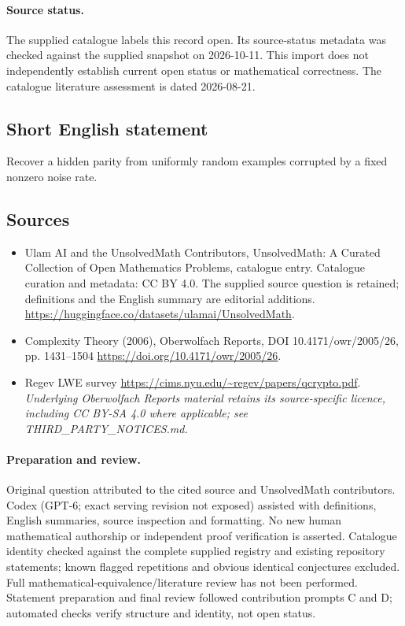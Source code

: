 \documentclass[11pt]{article}
\begin{document}
\paragraph{Source status.}
The supplied catalogue labels this record open. Its source-status metadata was checked against the supplied snapshot on 2026-10-11. This import does not independently establish current open status or mathematical correctness. The catalogue literature assessment is dated 2026-08-21.
\subsection{Short English statement}
Recover a hidden parity from uniformly random examples corrupted by a fixed nonzero noise rate.
\subsection{Sources}
\begin{itemize}
\item[\hypertarget{source:statement:1}{S1}] Ulam AI and the UnsolvedMath Contributors, UnsolvedMath: A Curated Collection of Open Mathematics Problems, catalogue entry. Catalogue curation and metadata: CC BY 4.0. The supplied source question is retained; definitions and the English summary are editorial additions.
\url{https://huggingface.co/datasets/ulamai/UnsolvedMath}.
\item[\hypertarget{source:statement:2}{S2}] Complexity Theory (2006), Oberwolfach Reports, DOI 10.4171/owr/2005/26, pp. 1431--1504
\url{https://doi.org/10.4171/owr/2005/26}.
\item[\hypertarget{source:statement:3}{S3}] Regev LWE survey
\url{https://cims.nyu.edu/~regev/papers/qcrypto.pdf}.
\textit{Underlying Oberwolfach Reports material retains its source-specific licence, including CC BY-SA 4.0 where applicable; see THIRD\_PARTY\_NOTICES.md.}
\end{itemize}
\paragraph{Preparation and review.}
Original question attributed to the cited source and UnsolvedMath contributors. Codex (GPT-6; exact serving revision not exposed) assisted with definitions, English summaries, source inspection and formatting. No new human mathematical authorship or independent proof verification is asserted. Catalogue identity checked against the complete supplied registry and existing repository statements; known flagged repetitions and obvious identical conjectures excluded. Full mathematical-equivalence/literature review has not been performed. Statement preparation and final review followed contribution prompts C and D; automated checks verify structure and identity, not open status.
\label{end:statement}
\end{document}
